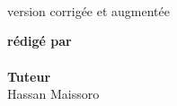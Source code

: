 \begin{titlepage}

	\begin{center}

		

		\textsc{\LARGE \projecttitle }\\[0.5cm]%
		{\Large \projectdescription}\\ [1cm]%

		\HRule%
		\vspace{0.4cm}%

		{\huge \bfseries \articletitle}\\[0.4cm]%
		
		\HRule%
		\vspace{1.5cm}%

		version corrigée et augmentée

	\vfill%
	\end{center}%
	
	
	
	\begin{flushright} \Large
		\textbf{rédigé par}%
		\\
		\auteur%
		\\
		\textbf{Tuteur}%
		\\
		Hassan Maissoro
	\end{flushright}



	\begin{center}
		{\large{\customdate}}
	\end{center}
\end{titlepage}
